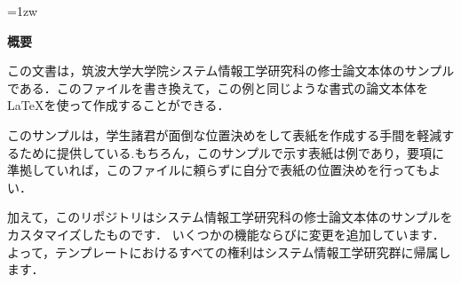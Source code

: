 \thispagestyle{empty}
\vspace*{20pt plus 1fil}
\parindent=1zw
\noindent

\begin{center}
    {\bf 概要}
    \vspace{5mm}
\end{center}

この文書は，筑波大学大学院システム情報工学研究科の修士論文本体のサンプル
である．このファイルを書き換えて，この例と同じような書式の論文本体を
\LaTeX を使って作成することができる．

このサンプルは，学生諸君が面倒な位置決めをして表紙を作成する手間を軽減す
るために提供している.もちろん，このサンプルで示す表紙は例であり，要項に
準拠していれば，このファイルに頼らずに自分で表紙の位置決めを行ってもよい．

\vspace{10mm}

加えて，このリポジトリはシステム情報工学研究科の修士論文本体のサンプルをカスタマイズしたものです．
いくつかの機能ならびに変更を追加しています．
よって，テンプレートにおけるすべての権利はシステム情報工学研究群に帰属します．

\vspace{0pt plus 1fil}
\newpage
